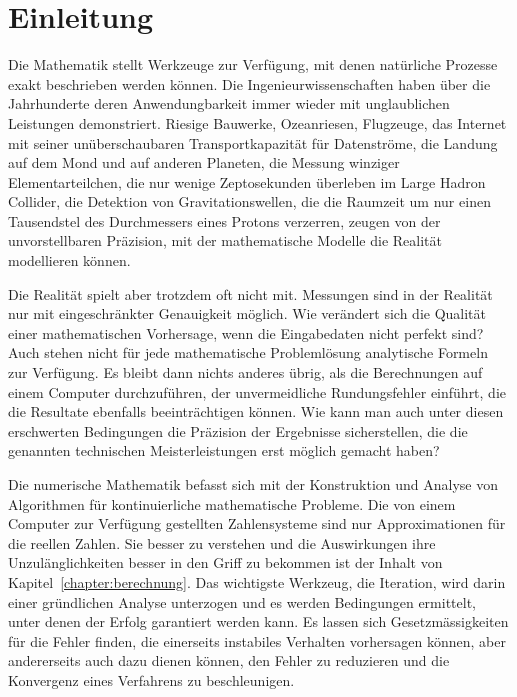 %
%
%
\chapter*{Einleitung\label{chapter:einleitung}}
\rhead{}
Die Mathematik stellt Werkzeuge zur Verfügung, mit denen natürliche
Prozesse exakt beschrieben werden können.
Die Ingenieurwissenschaften haben über die Jahrhunderte deren
Anwendungbarkeit immer wieder mit unglaublichen Leistungen
demonstriert.
Riesige Bauwerke, Ozeanriesen, Flugzeuge, das Internet mit seiner
unüberschaubaren Transportkapazität für Datenströme, die Landung auf
dem Mond und auf anderen Planeten, die Messung winziger Elementarteilchen,
die nur wenige Zeptosekunden überleben im Large Hadron Collider, die 
Detektion von Gravitationswellen, die die Raumzeit um nur einen Tausendstel
des Durchmessers eines Protons verzerren, zeugen von der unvorstellbaren
Präzision, mit der mathematische Modelle die Realität modellieren können.

Die Realität spielt aber trotzdem oft nicht mit.
Messungen sind in der Realität nur mit eingeschränkter Genauigkeit
möglich.
Wie verändert sich die Qualität einer mathematischen Vorhersage,
wenn die Eingabedaten nicht perfekt sind?
Auch stehen nicht für jede mathematische Problemlösung analytische
Formeln zur Verfügung.
Es bleibt dann nichts anderes übrig, als die Berechnungen auf einem
Computer durchzuführen, der unvermeidliche Rundungsfehler einführt,
die die Resultate ebenfalls beeinträchtigen können.
Wie kann man auch unter diesen erschwerten Bedingungen die Präzision
der Ergebnisse sicherstellen, die die genannten technischen Meisterleistungen
erst möglich gemacht haben?

Die numerische Mathematik befasst sich mit der Konstruktion und Analyse
von Algorithmen für kontinuierliche mathematische Probleme.
Die von einem Computer zur Verfügung gestellten Zahlensysteme sind nur
Approximationen für die reellen Zahlen.
%
Sie besser zu verstehen und die Auswirkungen ihre Unzulänglichkeiten 
besser in den Griff zu bekommen ist der Inhalt von
Kapitel~\ref{chapter:berechnung}.
Das wichtigste Werkzeug, die Iteration, wird darin einer gründlichen
Analyse unterzogen und es werden Bedingungen ermittelt, unter denen
der Erfolg garantiert werden kann.
Es lassen sich Gesetzmässigkeiten für die Fehler finden, die einerseits
instabiles Verhalten vorhersagen können, aber andererseits auch dazu
dienen können, den Fehler zu reduzieren und die Konvergenz eines
Verfahrens zu beschleunigen.

